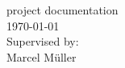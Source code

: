 \begin{titlepage}
\begin{center}
		\vspace{0.5cm}
		project documentation\\
		\vspace{2.2cm}
		\today\\
		\vspace{2.0cm}
		\large
		Supervised by:\\
		Marcel Müller\\
		\vspace{1cm}
		\end{center}
\end{titlepage}

\shipout\null
\shipout\null
